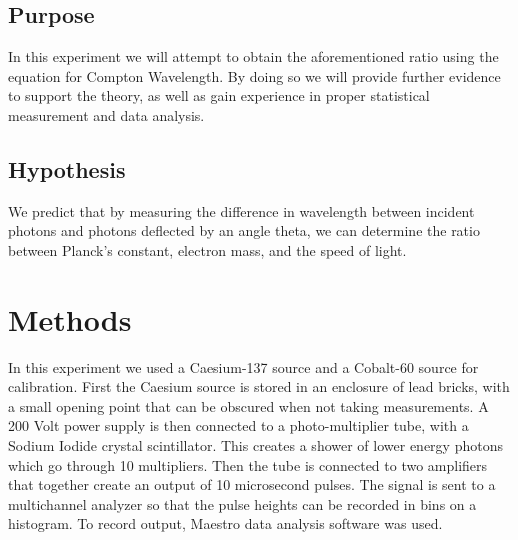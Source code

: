 \documentclass{article}
\begin{document}
\subsection{Purpose}

In this experiment we will attempt to obtain the aforementioned ratio using the equation for Compton Wavelength. By doing so we will provide further evidence to support the theory, as well as gain experience in proper statistical measurement and data analysis.

\subsection{Hypothesis}

We predict that by measuring the difference in wavelength between incident photons and photons deflected by an angle theta, we can determine the ratio between Planck's constant, electron mass, and the speed of light.

\section{Methods}

In this experiment we used a Caesium-137 source and a Cobalt-60 source for calibration. 
First the Caesium source is stored in an enclosure of lead bricks, with a small opening point that can be obscured when not taking measurements. 
A 200 Volt power supply is then connected to a photo-multiplier tube, with a Sodium Iodide crystal scintillator. 
This creates a shower of lower energy photons which go through 10 multipliers. Then the tube is connected to two amplifiers that together create an output of 10 microsecond pulses. 
The signal is sent to a multichannel analyzer so that the pulse heights can be recorded in bins on a histogram. 
To record output, Maestro data analysis software was used. \par
\end{document}
